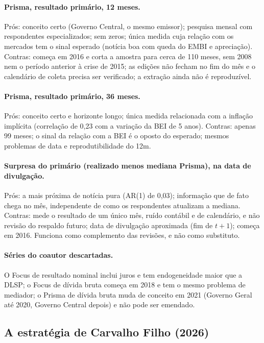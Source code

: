 \documentclass[12pt,a4paper]{article}
\begin{document}
\paragraph{Prisma, resultado primário, 12 meses.}
Prós: conceito certo (Governo Central, o mesmo emissor); pesquisa mensal com
respondentes especializados; sem zeros; única medida cuja relação com os mercados tem
o sinal esperado (notícia boa com queda do EMBI e apreciação). Contras: começa em
2016 e corta a amostra para cerca de 110 meses, sem 2008 nem o período anterior à
crise de 2015; as edições não fecham no fim do mês e o calendário de coleta precisa
ser verificado; a extração ainda não é reproduzível.

\paragraph{Prisma, resultado primário, 36 meses.}
Prós: conceito certo e horizonte longo; única medida relacionada com a inflação
implícita (correlação de 0,23 com a variação da BEI de 5 anos). Contras: apenas 99
meses; o sinal da relação com a BEI é o oposto do esperado; mesmos problemas de data e
reprodutibilidade do 12m.

\paragraph{Surpresa do primário (realizado menos mediana Prisma), na data de divulgação.}
Prós: a mais próxima de notícia pura (AR(1) de 0,03); informação que de fato chega no
mês, independente de como os respondentes atualizam a mediana. Contras: mede o
resultado de um único mês, ruído contábil e de calendário, e não revisão do respaldo
futuro; data de divulgação aproximada (fim de \(t+1\)); começa em 2016. Funciona como
complemento das revisões, e não como substituto.

\paragraph{Séries do coautor descartadas.}
O Focus de resultado nominal inclui juros e tem endogeneidade maior que a DLSP; o
Focus de dívida bruta começa em 2018 e tem o mesmo problema de mediador; o Prisma de
dívida bruta muda de conceito em 2021 (Governo Geral até 2020, Governo Central
depois) e não pode ser emendado.

\subsection{A estratégia de Carvalho Filho (2026)}\label{sec:cf}
\end{document}
